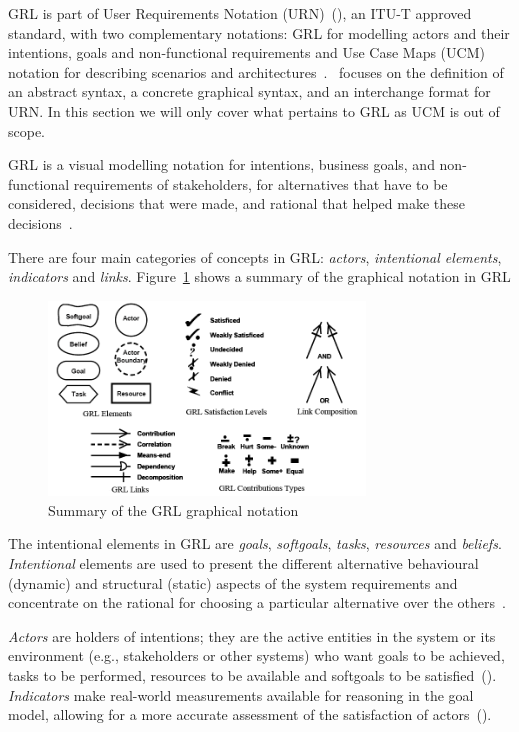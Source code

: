 \documentclass[dissertation,final]{softeng}
\begin{document}
{GRL is part of User Requirements Notation (URN)~(), an ITU-T approved standard, with two complementary notations: GRL for modelling actors and their intentions, goals and non-functional requirements and Use Case Maps (UCM) notation for describing scenarios and architectures~\citep{Amyot2003}.~ focuses on the definition of an abstract syntax, a concrete graphical syntax, and an interchange format for URN. In this section we will only cover what pertains to GRL as UCM is out of scope. 

GRL is a visual modelling notation for intentions, business goals, and non-functional requirements of stakeholders, for alternatives that have to be considered, decisions that were made, and rational that helped make these decisions~\citep{amyot2011user}.

There are four main categories of concepts in GRL: \emph{actors}, \emph{intentional elements}, \emph{indicators} and \emph{links}. Figure~\ref{fig:grl_visualsyntax} shows a summary of the graphical notation in GRL

\begin{figure}[h]
\includegraphics[width=0.75\textwidth]{grl_visualsyntax}
\centering
\caption[Summary of the GRL graphical notation]{Summary of the GRL graphical notation~\citep{Roy:2007wyba}}
\label{fig:grl_visualsyntax}
\end{figure}

The intentional elements in GRL are \emph{goals}, \emph{softgoals}, \emph{tasks}, \emph{resources} and \emph{beliefs}. \emph{Intentional} elements are used to present the different alternative behavioural (dynamic) and structural (static) aspects of the system requirements and concentrate on the rational for choosing a particular alternative over the others~\citep{Saleh2004}.

\emph{Actors} are holders of intentions; they are the active entities in the system or its environment (e.g., stakeholders or other systems) who want goals to be achieved, tasks to be performed, resources to be available and softgoals to be satisfied~(). \emph{Indicators} make real-world measurements available for reasoning in the goal model, allowing for a more accurate assessment of the satisfaction of actors~(). 

}
\end{document}
